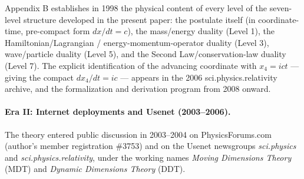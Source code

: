 \documentclass[11pt,a4paper]{article}
\begin{document}
Appendix B establishes in 1998 the physical content of every level of the seven-level structure developed in the present paper: the postulate itself (in coordinate-time, pre-compact form $dx/dt = c$), the mass/energy duality (Level 1), the Hamiltonian/Lagrangian / energy-momentum-operator duality (Level 3), wave/particle duality (Level 5), and the Second Law/conservation-law duality (Level 7). The explicit identification of the advancing coordinate with $x_4 = ict$ --- giving the compact $dx_4/dt = ic$ --- appears in the 2006 sci.physics.relativity archive, and the formalization and derivation program from 2008 onward.

\paragraph{Era II: Internet deployments and Usenet (2003--2006).} The theory entered public discussion in 2003--2004 on PhysicsForums.com (author's member registration \#3753) and on the Usenet newsgroups \emph{sci.physics} and \emph{sci.physics.relativity}, under the working names \emph{Moving Dimensions Theory} (MDT) and \emph{Dynamic Dimensions Theory} (DDT).
\end{document}
